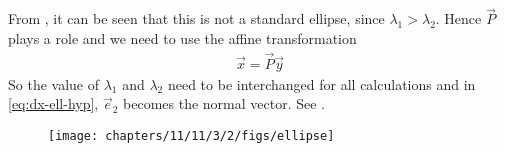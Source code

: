 From , it can be seen that this is not a standard ellipse, since $\lambda_1 > \lambda_2$.  Hence $\vec{P}$ plays a role and we need to use the affine transformation
\begin{align}
\vec{x} = \vec{P}\vec{y}
\end{align}
So the value of $\lambda_1$ and $\lambda_2$ need to be interchanged for all calculations and 
in
					\eqref{eq:dx-ell-hyp},
					$\vec{e}_2$ becomes the normal vector.
See .
\begin{figure}[H]
	\begin{center} 
	    \texttt{[image: chapters/11/11/3/2/figs/ellipse]}
	\end{center}
\caption{}
\label{fig:chapters/11/11/3/2/Fig1}
\end{figure}
